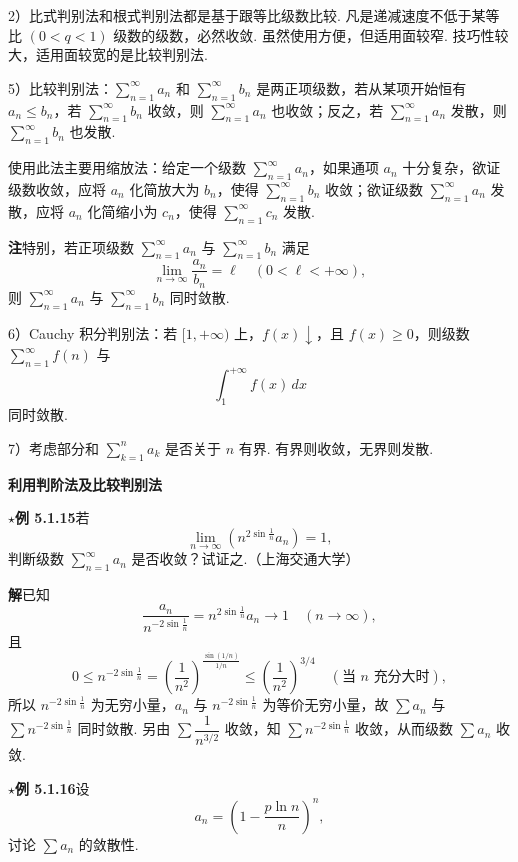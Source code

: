 \documentclass[UTF8, 12pt, fontset=fandol, oneside]{ctexart}
\begin{document}
2）比式判别法和根式判别法都是基于跟等比级数比较. 凡是递减速度不低于某等比 $(0<q<1)$ 级数的级数，必然收敛. 虽然使用方便，但适用面较窄. 技巧性较大，适用面较宽的是比较判别法.

5）比较判别法：$\displaystyle\sum_{n=1}^\infty a_n$ 和 $\displaystyle\sum_{n=1}^\infty b_n$ 是两正项级数，若从某项开始恒有 $a_n\le b_n$，若 $\displaystyle\sum_{n=1}^\infty b_n$ 收敛，则 $\displaystyle\sum_{n=1}^\infty a_n$ 也收敛；反之，若 $\displaystyle\sum_{n=1}^\infty a_n$ 发散，则 $\displaystyle\sum_{n=1}^\infty b_n$ 也发散.

使用此法主要用缩放法：给定一个级数 $\displaystyle\sum_{n=1}^\infty a_n$，如果通项 $a_n$ 十分复杂，欲证级数收敛，应将 $a_n$ 化简放大为 $b_n$，使得 $\displaystyle\sum_{n=1}^\infty b_n$ 收敛；欲证级数 $\displaystyle\sum_{n=1}^\infty a_n$ 发散，应将 $a_n$ 化简缩小为 $c_n$，使得 $\displaystyle\sum_{n=1}^\infty c_n$ 发散.

\noindent\textbf{注}\quad 特别，若正项级数 $\displaystyle\sum_{n=1}^\infty a_n$ 与 $\displaystyle\sum_{n=1}^\infty b_n$ 满足
\[
  \lim_{n\to\infty}\frac{a_n}{b_n}=\ell\quad(0<\ell<+\infty),
\]
则 $\displaystyle\sum_{n=1}^\infty a_n$ 与 $\displaystyle\sum_{n=1}^\infty b_n$ 同时敛散.

6）Cauchy 积分判别法：若 $[1,+\infty)$ 上，$f(x)\downarrow$，且 $f(x)\ge0$，则级数 $\displaystyle\sum_{n=1}^\infty f(n)$ 与
\[
  \int_1^{+\infty} f(x)\,dx
\]
同时敛散.

7）考虑部分和 $\displaystyle\sum_{k=1}^n a_k$ 是否关于 $n$ 有界. 有界则收敛，无界则发散.

\noindent\textbf{利用判阶法及比较判别法}

\noindent\textbf{$\star$例 5.1.15}\quad 若
\[
  \lim_{n\to\infty}\left(n^{2\sin\frac1n}a_n\right)=1,
\]
判断级数 $\displaystyle\sum_{n=1}^\infty a_n$ 是否收敛？试证之.（上海交通大学）

\noindent\textbf{解}\quad 已知
\[
  \frac{a_n}{n^{-2\sin\frac1n}}=n^{2\sin\frac1n}a_n\to1\quad(n\to\infty),
\]
且
\[
  0\le n^{-2\sin\frac1n}=\left(\frac1{n^2}\right)^{\frac{\sin(1/n)}{1/n}}
  \le \left(\frac1{n^2}\right)^{3/4}\quad(\text{当 }n\text{ 充分大时}),
\]
所以 $n^{-2\sin\frac1n}$ 为无穷小量，$a_n$ 与 $n^{-2\sin\frac1n}$ 为等价无穷小量，故 $\sum a_n$ 与 $\sum n^{-2\sin\frac1n}$ 同时敛散. 另由 $\sum\dfrac1{n^{3/2}}$ 收敛，知 $\sum n^{-2\sin\frac1n}$ 收敛，从而级数 $\sum a_n$ 收敛.

\noindent\textbf{$\star$例 5.1.16}\quad 设
\[
  a_n=\left(1-\frac{p\ln n}{n}\right)^n,
\]
讨论 $\sum a_n$ 的敛散性.
\end{document}
